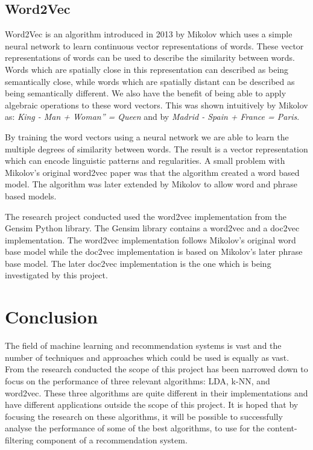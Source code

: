 \subsection{Word2Vec}
Word2Vec is an algorithm introduced in 2013 by Mikolov which uses a simple neural network to learn continuous vector representations of words.
These vector representations of words can be used to describe the similarity between words.
Words which are spatially close in this representation can described as being semantically close, while words which are spatially distant can be described as being semantically different.
We also have the benefit of being able to apply algebraic operations to these  word vectors.
This was shown intuitively by Mikolov as: \textit{King - Man + Woman” = Queen} and by \textit{Madrid - Spain + France = Paris}.

By training the word vectors using a neural network we are able to learn the multiple degrees of similarity between words\cite{Mikolov1}.
The result is a vector representation which can encode linguistic patterns and regularities.\cite{Mikolov2}
A small problem with Mikolov's original word2vec paper was that the algorithm created a word based model.
The algorithm was later extended by Mikolov to allow word and phrase based models.\cite{Mikolov2}

The research project conducted used the word2vec implementation from the Gensim Python library.
The Gensim library contains a word2vec and a doc2vec implementation. The word2vec implementation follows Mikolov's original word base model while the doc2vec implementation is based on Mikolov's later phrase base model.\cite{radimDoc2Vec}
The later doc2vec implementation is the one which is being investigated by this project.


\section{Conclusion}
The field of machine learning and recommendation systems is vast and the number of techniques and approaches which could be used is equally as vast.
From the research conducted the scope of this project has been narrowed down to focus on the performance of three relevant algorithms: LDA, k-NN, and word2vec.
These three algorithms are quite different in their implementations and have different applications outside the scope of this project.
It is hoped that by focusing the research on these algorithms, it will be possible to successfully analyse the performance of some of the best algorithms, to use for the content-filtering component of a recommendation system.
